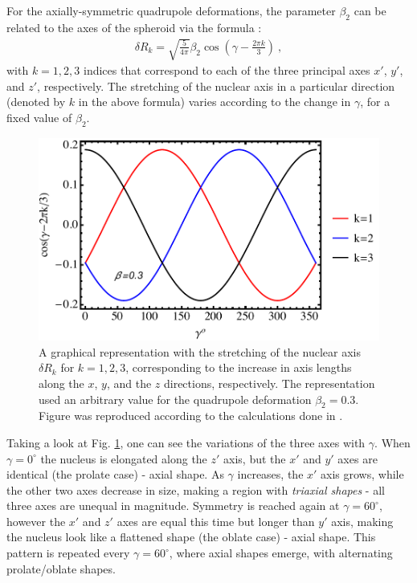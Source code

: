 For the axially-symmetric quadrupole deformations, the parameter $\beta_2$ can be related to the axes of the spheroid via the formula \cite{greiner1996nuclear}:
\begin{align}
    \delta R_k=\sqrt{\frac{5}{4\pi}}\beta_2\cos\left(\gamma-\frac{2\pi k}{3}\right)\ ,
\end{align}
with $k=1,2,3$ indices that correspond to each of the three principal axes $x'$, $y'$, and $z'$, respectively. The stretching of the nuclear axis in a particular direction (denoted by $k$ in the above formula) varies according to the change in $\gamma$, for a fixed value of $\beta_2$.

\begin{figure}
    \centering
    \includegraphics[scale=0.65]{Chapters/Figures/nuclear-radius-elongation.pdf}
    \caption{A graphical representation with the stretching of the nuclear axis $\delta R_k$ for $k=1,2,3$, corresponding to the increase in axis lengths along the $x$, $y$, and the $z$ directions, respectively. The representation used an arbitrary value for the quadrupole deformation $\beta_2=0.3$. Figure was reproduced according to the calculations done in \cite{greiner1996nuclear}.}
    \label{nuclear-radius-elongation}
\end{figure}

Taking a look at Fig. \ref{nuclear-radius-elongation}, one can see the variations of the three axes with $\gamma$. When $\gamma=0^\circ$ the nucleus is elongated along the $z'$ axis, but the $x'$ and $y'$ axes are identical (the prolate case) - axial shape. As $\gamma$ increases, the $x'$ axis grows, while the other two axes decrease in size, making a region with \emph{triaxial shapes} - all three axes are unequal in magnitude. Symmetry is reached again at $\gamma=60^\circ$, however the $x'$ and $z'$ axes are equal this time but longer than $y'$ axis, making the nucleus look like a flattened shape (the oblate case) - axial shape. This pattern is repeated every $\gamma=60^\circ$, where axial shapes emerge, with alternating prolate/oblate shapes.

